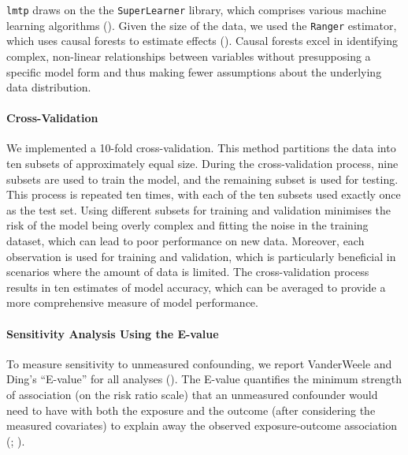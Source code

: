 \documentclass[
  singlecolumn]{article}
\let\oldparagraph\paragraph
\renewcommand{\paragraph}[1]{\oldparagraph{#1}\mbox{}}
\begin{document}
\texttt{lmtp} draws on the the \texttt{SuperLearner} library, which
comprises various machine learning algorithms
(). Given the
size of the data, we used the \texttt{Ranger} estimator, which uses
causal forests to estimate effects (). Causal forests excel in identifying complex, non-linear
relationships between variables without presupposing a specific model
form and thus making fewer assumptions about the underlying data
distribution.

\paragraph{Cross-Validation}\label{cross-validation}

We implemented a 10-fold cross-validation. This method partitions the
data into ten subsets of approximately equal size. During the
cross-validation process, nine subsets are used to train the model, and
the remaining subset is used for testing. This process is repeated ten
times, with each of the ten subsets used exactly once as the test set.
Using different subsets for training and validation minimises the risk
of the model being overly complex and fitting the noise in the training
dataset, which can lead to poor performance on new data. Moreover, each
observation is used for training and validation, which is particularly
beneficial in scenarios where the amount of data is limited. The
cross-validation process results in ten estimates of model accuracy,
which can be averaged to provide a more comprehensive measure of model
performance.

\paragraph{Sensitivity Analysis Using the
E-value}\label{sensitivity-analysis-using-the-e-value}

To measure sensitivity to unmeasured confounding, we report VanderWeele
and Ding's ``E-value'' for all analyses
(). The E-value
quantifies the minimum strength of association (on the risk ratio scale)
that an unmeasured confounder would need to have with both the exposure
and the outcome (after considering the measured covariates) to explain
away the observed exposure-outcome association
(;
).
\end{document}
